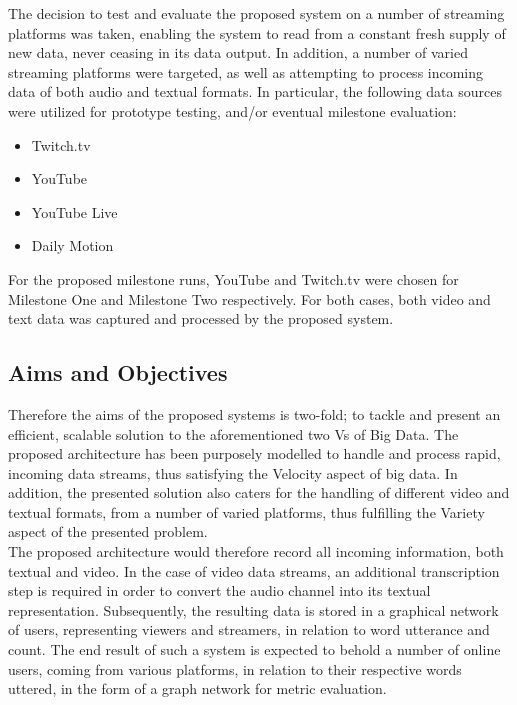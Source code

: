 \documentclass[10pt,conference]{IEEEtran}
\begin{document}
The decision to test and evaluate the proposed system on a number of streaming platforms was taken, enabling the system to read from a constant fresh supply of new data, never ceasing in its data output. In addition, a number of varied streaming platforms were targeted, as well as attempting to process incoming data of both audio and textual formats. In particular, the following data sources were utilized for prototype testing, and/or eventual milestone evaluation:
\begin{itemize}
    \item Twitch.tv \cite{Twitch}
    \item YouTube \cite{YouTube}
    \item YouTube Live \cite{YouTubeLive}
    \item Daily Motion \cite{DailyMotion}
\end{itemize}

For the proposed milestone runs, YouTube and Twitch.tv were chosen for Milestone One and Milestone Two respectively. For both cases, both video and text data was captured and processed by the proposed system. 

\subsection{Aims and Objectives}
Therefore the aims of the proposed systems is two-fold; to tackle and present an efficient, scalable solution to the aforementioned two Vs of Big Data. The proposed architecture has been purposely modelled to handle and process rapid, incoming data streams, thus satisfying the Velocity aspect of big data. In addition, the presented solution also caters for the handling of different video and textual formats, from a number of varied platforms, thus fulfilling the Variety aspect of the presented problem.
\\
The proposed architecture would therefore record all incoming information, both textual and video. In the case of video data streams, an additional transcription step is required in order to convert the audio channel into its textual representation. Subsequently, the resulting data is stored in a graphical network of users, representing viewers and streamers, in relation to word utterance and count. The end result of such a system is expected to behold a number of online users, coming from various platforms, in relation to their respective words uttered, in the form of a graph network for metric evaluation.
\end{document}
